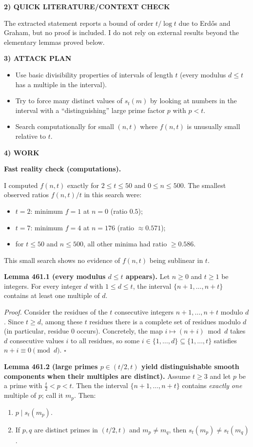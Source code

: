 \noindent\textbf{2) QUICK LITERATURE/CONTEXT CHECK}

The extracted statement reports a bound of order $t/\log t$ due to Erd\H{o}s and Graham, but no proof is included. I do not rely on external results beyond the elementary lemmas proved below.

\noindent\textbf{3) ATTACK PLAN}

\begin{itemize}
\item Use basic divisibility properties of intervals of length $t$ (every modulus $d\le t$ has a multiple in the interval).
\item Try to force many distinct values of $s_t(m)$ by looking at numbers in the interval with a ``distinguishing'' large prime factor $p$ with $p<t$.
\item Search computationally for small $(n,t)$ where $f(n,t)$ is unusually small relative to $t$.
\end{itemize}

\noindent\textbf{4) WORK}

\textbf{Fast reality check (computations).}

I computed $f(n,t)$ exactly for $2\le t\le 50$ and $0\le n\le 500$.  The smallest observed ratios $f(n,t)/t$ in this search were:
\begin{itemize}
\item $t=2$: minimum $f=1$ at $n=0$ (ratio $0.5$);
\item $t=7$: minimum $f=4$ at $n=176$ (ratio $\approx 0.571$);
\item for $t\le 50$ and $n\le 500$, all other minima had ratio $\ge 0.586$.
\end{itemize}
This small search shows no evidence of $f(n,t)$ being sublinear in $t$.

\medskip
\noindent\textbf{Lemma 461.1 (every modulus $d\le t$ appears).}
Let $n\ge 0$ and $t\ge 1$ be integers. For every integer $d$ with $1\le d\le t$, the interval $\{n+1,\dots,n+t\}$ contains at least one multiple of $d$.

\textit{Proof.}
Consider the residues of the $t$ consecutive integers $n+1,\dots,n+t$ modulo $d$. Since $t\ge d$, among these $t$ residues there is a complete set of residues modulo $d$ (in particular, residue $0$ occurs). Concretely, the map $i\mapsto (n+i)\bmod d$ takes $d$ consecutive values $i$ to all residues, so some $i\in\{1,\dots,d\}\subseteq\{1,\dots,t\}$ satisfies $n+i\equiv 0\pmod d$. \hfill$\square$

\medskip
\noindent\textbf{Lemma 461.2 (large primes $p\in(t/2,t)$ yield distinguishable smooth components when their multiples are distinct).}
Assume $t\ge 3$ and let $p$ be a prime with $\tfrac{t}{2}<p<t$. Then the interval $\{n+1,\dots,n+t\}$ contains \emph{exactly one} multiple of $p$; call it $m_p$. Then:
\begin{enumerate}
\item $p\mid s_t(m_p)$.
\item If $p,q$ are distinct primes in $(t/2,t)$ and $m_p\neq m_q$, then $s_t(m_p)\neq s_t(m_q)$.
\end{enumerate}

